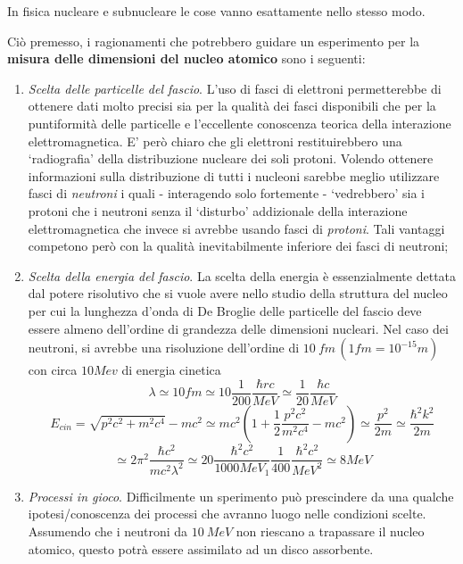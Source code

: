 In fisica nucleare e subnucleare le cose vanno esattamente nello stesso
modo.

Ciò premesso, i ragionamenti che potrebbero guidare un esperimento per
la \textbf{misura delle dimensioni del nucleo atomico} sono i seguenti:
\begin{enumerate}
	\tightlist
	\item
	\emph{Scelta delle particelle del fascio}. L'uso di fasci di elettroni
	permetterebbe di ottenere dati molto precisi sia per la qualità dei
	fasci disponibili che per la puntiformità delle particelle e
	l'eccellente conoscenza teorica della interazione elettromagnetica. E'
	però chiaro che gli elettroni restituirebbero una `radiografia' della
	distribuzione nucleare dei soli protoni. Volendo ottenere informazioni
	sulla distribuzione di tutti i nucleoni sarebbe meglio utilizzare
	fasci di \emph{neutroni} i quali - interagendo solo fortemente -
	`vedrebbero' sia i protoni che i neutroni senza il `disturbo'
	addizionale della interazione elettromagnetica che invece si avrebbe
	usando fasci di \emph{protoni}. Tali vantaggi competono però con la
	qualità inevitabilmente inferiore dei fasci di neutroni;
	\item
	\emph{Scelta della energia del fascio}. La scelta della energia è
	essenzialmente dettata dal potere risolutivo che si vuole avere nello
	studio della struttura del nucleo per cui la lunghezza d'onda di De
	Broglie delle particelle del fascio deve essere almeno dell'ordine di
	grandezza delle dimensioni nucleari. Nel caso dei neutroni, si avrebbe
	una risoluzione dell'ordine di \(10 \  fm \,(1 fm=10^{-15} m)\) con
	circa \(10 Mev\) di energia cinetica
	\[ \lambda \simeq 10 fm \simeq 10 \frac{1}{200} \frac{\hbar r c}{MeV} \simeq \frac{1}{20} \frac{\hbar  c}{MeV}\]
	\[ E_{cin} = \sqrt{ p^{2}c^{2}+m^{2}c^4 } - mc^{2} \simeq mc^{2} \left(1 + \frac{1}{2} \frac{{p^{2}c^{2}}}{m^{2}c^4}- mc^{2}\right) \simeq \frac{p^{2}}{2m} \simeq \frac{\hbar^{2}k^{2}}{2m}\]
	\[ \simeq 2\pi^{2} \frac{\hbar c^{2}}{mc^{2}\lambda^{2}} \simeq 20 \frac{\hbar^{2} c^{2} }{1000MeV_{1}} \frac{1}{400} \frac{\hbar^{2} c^{2}}{MeV^2} \simeq 8 MeV\]
	\item
	\emph{Processi in gioco}. Difficilmente un sperimento può prescindere
	da una qualche ipotesi/conoscenza dei processi che avranno luogo nelle
	condizioni scelte. Assumendo che i neutroni da \(10 \ MeV\) non
	riescano a trapassare il nucleo atomico, questo potrà essere
	assimilato ad un disco assorbente.
\end{enumerate}

